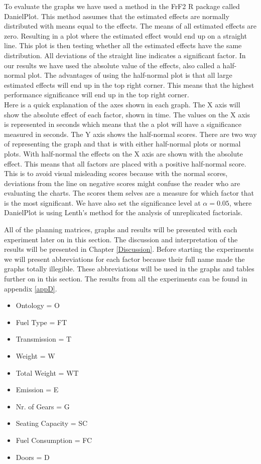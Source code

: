 \documentclass{llncs}
\begin{document}
To evaluate the graphs we have used a method in the \textsf{FrF2} R
package called \textsf{DanielPlot}. This method assumes that the
estimated effects are normally distributed with means equal to the
effects. The means of all estimated effects are zero. Resulting in a
plot where the estimated effect would end up on a straight line. This
plot is then testing whether all the estimated effects have the same
distribution. All deviations of the straight line indicates a
significant factor. In our results we have used the absolute value of
the effects, also called a half-normal plot. The advantages of using
the half-normal plot is that all large estimated effects will end up
in the top right corner. This means that the highest performance
significance will end up in
the top right corner.~\cite{Plotting} \\
Here is a quick explanation of the axes shown in each graph.  The X
axis will show the absolute effect of each factor, shown in time. The
values on the X axis is represented in seconds which means that the a
plot will have a significance measured in seconds.  The Y axis shows
the half-normal scores. There are two way of representing the graph
and that is with either half-normal plots or normal plots. With
half-normal the effects on the X axis are shown with the absolute
effect. This means that all factors are placed with a positive
half-normal score. This is to avoid visual misleading scores because
with the normal scores, deviations from the line on negative scores
might confuse the reader who are evaluating the charts.  The scores
them selves are a measure for which factor that is the most
significant.  We have also set  the significance level at $\alpha =
0.05$, where \textsf{DanielPlot} is using Lenth's method for the
analysis of unreplicated factorials. %

All of the planning matrices, graphs and results will be presented
with each experiment later on in this section.  The discussion and
interpretation of the results will be presented in Chapter
\ref{Discussion}.  Before starting the experiments we will present
abbreviations for each factor because their full name made the graphs
totally illegible. These abbreviations will be used in the graphs and
tables further on in this section.  The results from all the
experiments can be found in appendix \ref{appD}.
\begin{itemize}
  \item Ontology = O
  \item Fuel Type = FT
  \item Transmission = T
  \item Weight = W
  \item Total Weight = WT
  \item Emission = E
  \item Nr. of Gears = G
  \item Seating Capacity = SC
  \item Fuel Consumption = FC
  \item Doors = D
\end{itemize}
\end{document}
